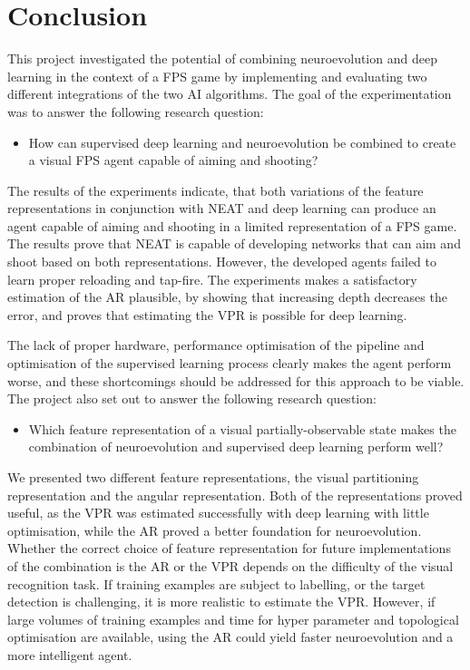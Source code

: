 
\pagebreak

\section{Conclusion}
\label{sec:conclusion}
This project investigated the potential of combining neuroevolution and deep learning in the context of a FPS game by implementing and evaluating two different integrations of the two AI algorithms. The goal of the experimentation was to answer the following research question:
\begin{itemize}
\item How can supervised deep learning and neuroevolution be combined to create a visual FPS agent capable of aiming and shooting?
\end{itemize}
The results of the experiments indicate, that both variations of the feature representations in conjunction with NEAT and deep learning can produce an agent capable of aiming and shooting in a limited representation of a FPS game. The results prove that NEAT is capable of developing networks that can aim and shoot based on both representations. However, the developed agents failed to learn proper reloading and tap-fire. The experiments makes a satisfactory estimation of the AR plausible, by showing that increasing depth decreases the error, and proves that estimating the VPR is possible for deep learning.

The lack of proper hardware, performance optimisation of the pipeline and optimisation of the supervised learning process clearly makes the agent perform worse, and these shortcomings should be addressed for this approach to be viable. The project also set out to answer the following research question:
\begin{itemize}
\item Which feature representation of a visual partially-observable state makes the combination of neuroevolution and supervised deep learning perform well?
\end{itemize}
We presented two different feature representations, the visual partitioning representation and the angular representation. Both of the representations proved useful, as the VPR was estimated successfully with deep learning with little optimisation, while the AR proved a better foundation for neuroevolution. Whether the correct choice of feature representation for future implementations of the combination is the AR or the VPR depends on the difficulty of the visual recognition task. If training examples are subject to labelling, or the target detection is challenging, it is more realistic to estimate the VPR. However, if large volumes of training examples and time for hyper parameter and topological optimisation are available, using the AR could yield faster neuroevolution and a more intelligent agent.
